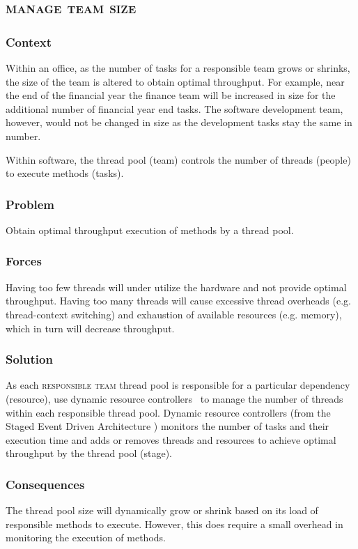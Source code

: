 \documentclass[prodmode]{style/acmlarge}
\begin{document}
\subsection{\textsc{\textbf{manage team size}}}

\subsubsection*{Context} Within an office, as the number of tasks for a
responsible team grows or shrinks, the size of the team is altered to obtain
optimal throughput.  For example, near the end of the financial year the finance
team will be increased in size for the additional number of financial year end
tasks.  The software development team, however, would not be changed in size as
the development tasks stay the same in number.

Within software, the thread pool (team) controls the number of threads (people)
to execute methods (tasks).

\subsubsection*{\textbf{Problem}} Obtain optimal throughput execution of methods by a
thread pool.

\subsubsection*{Forces} Having too few threads will under utilize the hardware
and not provide optimal throughput.  Having too many threads will cause
excessive thread overheads (e.g. thread-context switching) and exhaustion of
available resources (e.g. memory), which in turn will decrease throughput.

\subsubsection*{\textbf{Solution}} As each \textsc{responsible team} thread pool
is responsible for a particular dependency (resource), use dynamic resource
controllers~\cite{seda} to manage the number of threads within each responsible
thread pool.  Dynamic resource controllers (from the Staged Event Driven
Architecture \cite{seda}) monitors the number of tasks and their execution time
and adds or removes threads and resources to achieve optimal throughput by the
thread pool (stage).

\subsubsection*{Consequences} The thread pool size will dynamically grow or
shrink based on its load of responsible methods to execute.  However, this does
require a small overhead in monitoring the execution of methods.
\end{document}
